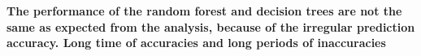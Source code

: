 \documentclass[letterpaper, 10 pt, conference]{ieeeconf}  %
\begin{document}
\textbf{The performance of the random forest and decision trees are not the same as expected from the analysis, because of the irregular prediction accuracy. Long time of accuracies and long periods of inaccuracies}


%
%
\end{document}
